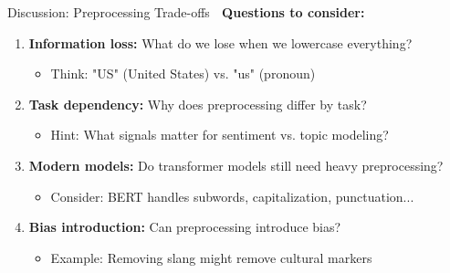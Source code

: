 \documentclass[aspectratio=169]{beamer}
\begin{document}
\begin{frame}[shrink=10]{Discussion: Preprocessing Trade-offs 🤔}
    \textbf{Questions to consider:}

    \begin{enumerate}\setlength{\itemsep}{0pt}
        \item \textbf{Information loss:} What do we lose when we lowercase everything?
        \begin{itemize}\setlength{\itemsep}{0pt}
            \item Think: "US" (United States) vs. "us" (pronoun)
        \end{itemize}

        \item \textbf{Task dependency:} Why does preprocessing differ by task?
        \begin{itemize}\setlength{\itemsep}{0pt}
            \item Hint: What signals matter for sentiment vs. topic modeling?
        \end{itemize}

        \item \textbf{Modern models:} Do transformer models still need heavy preprocessing?
        \begin{itemize}\setlength{\itemsep}{0pt}
            \item Consider: BERT handles subwords, capitalization, punctuation...
        \end{itemize}

        \item \textbf{Bias introduction:} Can preprocessing introduce bias?
        \begin{itemize}\setlength{\itemsep}{0pt}
            \item Example: Removing slang might remove cultural markers
        \end{itemize}
    \end{enumerate}
\end{frame}
\end{document}
